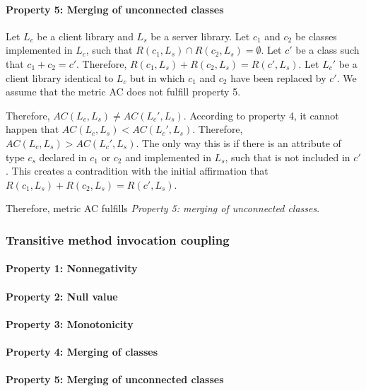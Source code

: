 \paragraph{Property 5: Merging of unconnected classes}
Let $L_c$ be a client library and $L_s$ be a server library. Let $c_1$ and $c_2$ be classes implemented in $L_c$, such that $R(c_1, L_s) \cap R(c_2, L_s) = \emptyset$. Let $c'$ be a class such that $c_1 + c_2 = c'$. Therefore, $R(c_1, L_s) + R(c_2, L_s) = R(c', L_s)$. Let $L_c'$ be a client library identical to $L_c$ but in which $c_1$ and $c_2$ have been replaced by $c'$. We assume that the metric AC does not fulfill property 5.

Therefore, $AC(L_c, L_s) \neq AC(L_c', L_s)$. According to property 4, it cannot happen that $AC(L_c, L_s) < AC(L_c', L_s)$. Therefore, $AC(L_c, L_s) > AC(L_c', L_s)$. The only way this is if there is an attribute of type $c_s$ declared in $c_1$ or $c_2$ and implemented in $L_s$, such that is not included in $c'$. This creates a contradition with the initial affirmation that $R(c_1, L_s) + R(c_2, L_s) = R(c', L_s)$.

Therefore, metric AC fulfills \textit{Property 5: merging of unconnected classes}.

\subsubsection{Transitive method invocation coupling}
\paragraph{Property 1: Nonnegativity}

\paragraph{Property 2: Null value}

\paragraph{Property 3: Monotonicity}

\paragraph{Property 4: Merging of classes}

\paragraph{Property 5: Merging of unconnected classes}

